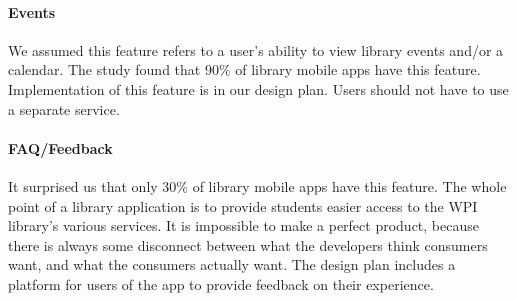     \paragraph{Events}
    We assumed this feature refers to a user's ability to view library events and/or a calendar. The study found that 90\% of library mobile apps have this feature. Implementation of this feature is in our design plan. Users should not have to use a separate service.
    
    \paragraph{FAQ/Feedback}
    It surprised us that only 30\% of library mobile apps have this feature. The whole point of a library application is to provide students easier access to the WPI library's various services. It is impossible to make a perfect product, because there is always some disconnect between what the developers think consumers want, and what the consumers actually want. The design plan includes a platform for users of the \appname app to provide feedback on their experience.